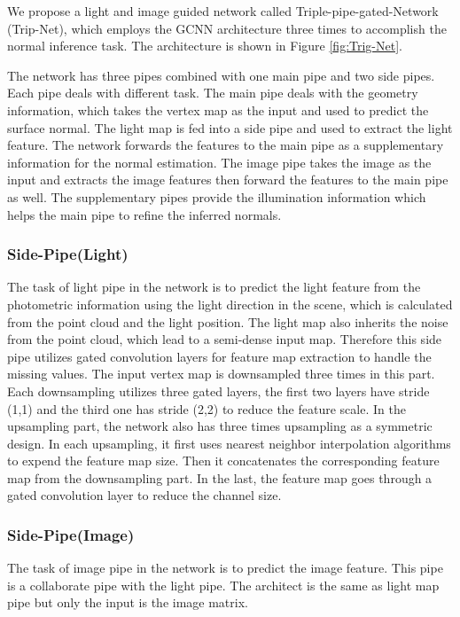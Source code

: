 We propose a light and image guided network called Triple-pipe-gated-Network (Trip-Net), which employs the GCNN architecture three times to accomplish the normal inference task. The architecture is shown in Figure \ref{fig:Trig-Net}.

The network has three pipes combined with one main pipe and two side pipes. Each pipe deals with different task. The main pipe deals with the geometry information, which takes the vertex map as the input and used to predict the surface normal. The light map is fed into a side pipe and used to extract the light feature. The network forwards the features to the main pipe as a supplementary information for the normal estimation. The image pipe takes the image as the input and extracts the image features then forward the features to the main pipe as well. The supplementary pipes provide the illumination information which helps the main pipe to refine the inferred normals.
\subsubsection{Side-Pipe(Light)}
The task of light pipe in the network is to predict the light feature from the photometric information using the light direction in the scene, which is calculated from the point cloud and the light position. The light map also inherits the noise from the point cloud, which lead to a semi-dense input map. Therefore this side pipe utilizes gated convolution layers for feature map extraction to handle the missing values. The input vertex map is downsampled three times in this part. Each downsampling utilizes three gated layers, the first two layers have stride (1,1) and the third one has stride (2,2) to reduce the feature scale. 
In the upsampling part, the network also has three times upsampling as a symmetric design. In each upsampling, it first uses nearest neighbor interpolation algorithms to expend the feature map size. Then it concatenates the corresponding feature map from the downsampling part. In the last, the feature map goes through a gated convolution layer to reduce the channel size. 

\subsubsection{Side-Pipe(Image)}
The task of image pipe in the network is to predict the image feature. This pipe is a collaborate pipe with the light pipe. The architect is the same as light map pipe but only the input is the image matrix. 


